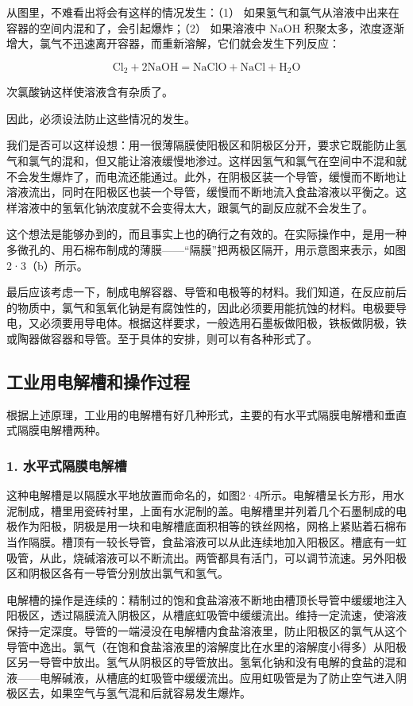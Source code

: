 从图里，不难看出将会有这样的情况发生：（1）
如果氢气和氯气从溶液中出来在容器的空间内混和了，会引起爆炸；（2）
如果溶液中 NaOH
积聚太多，浓度逐渐增大，氯气不迅速离开容器，而重新溶解，它们就会发生下列反应：

\[
\mathrm{Cl} _ {2} + 2 \mathrm{NaOH} = \mathrm{NaClO} + \mathrm{NaCl} + \mathrm{H} _ {2} \mathrm{O}
\]

次氯酸钠这样使溶液含有杂质了。

因此，必须设法防止这些情况的发生。

我们是否可以这样设想：用一很薄隔膜使阳极区和阴极区分开，要求它既能防止氢气和氯气的混和，但又能让溶液缓慢地渗过。这样因氢气和氯气在空间中不混和就不会发生爆炸了，而电流还能通过。此外，在阴极区装一个导管，缓慢而不断地让溶液流出，同时在阳极区也装一个导管，缓慢而不断地流入食盐溶液以平衡之。这样溶液中的氢氧化钠浓度就不会变得太大，跟氯气的副反应就不会发生了。

这个想法是能够办到的，而且事实上也的确行之有效的。在实际操作中，是用一种多微孔的、用石棉布制成的薄膜------``隔膜''把两极区隔开，用示意图来表示，如图2·3（b）所示。

最后应该考虑一下，制成电解容器、导管和电极等的材料。我们知道，在反应前后的物质中，氯气和氢氧化钠是有腐蚀性的，因此必须要用能抗蚀的材料。电极要导电，又必须要用导电体。根据这样要求，一般选用石墨板做阳极，铁板做阴极，铁或陶器做容器和导管。至于具体的安排，则可以有各种形式了。

\subsection{工业用电解槽和操作过程}

根据上述原理，工业用的电解槽有好几种形式，主要的有水平式隔膜电解槽和垂直式隔膜电解槽两种。

\subsubsection{1. 水平式隔膜电解槽}

这种电解槽是以隔膜水平地放置而命名的，如图2·4所示。电解槽呈长方形，用水泥制成，槽里用瓷砖衬里，上面有水泥制的盖。电解槽里并列着几个石墨制成的电极作为阳极，阴极是用一块和电解槽底面积相等的铁丝网格，网格上紧贴着石棉布当作隔膜。槽顶有一较长导管，食盐溶液可以从此连续地加入阳极区。槽底有一虹吸管，从此，烧碱溶液可以不断流出。两管都具有活门，可以调节流速。另外阳极区和阴极区各有一导管分别放出氯气和氢气。

电解槽的操作是连续的：精制过的饱和食盐溶液不断地由槽顶长导管中缓缓地注入阳极区，透过隔膜流入阴极区，从槽底虹吸管中缓缓流出。维持一定流速，使溶液保持一定深度。导管的一端浸没在电解槽内食盐溶液里，防止阳极区的氯气从这个导管中逸出。氯气（在饱和食盐溶液里的溶解度比在水里的溶解度小得多）从阳极区另一导管中放出。氢气从阴极区的导管放出。氢氧化钠和没有电解的食盐的混和液------电解碱液，从槽底的虹吸管中缓缓流出。应用虹吸管是为了防止空气进入阴极区去，如果空气与氢气混和后就容易发生爆炸。

